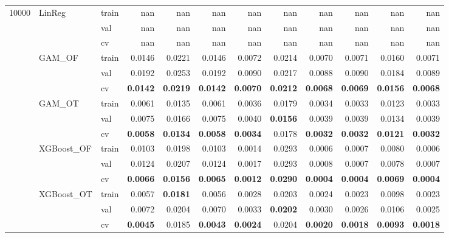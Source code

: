 \begin{tabular}{lllrrrrrrrrr}
\multirow[c]{15}{*}{10000} & \multirow[c]{3}{*}{LinReg} & train & nan & nan & nan & nan & nan & nan & nan & nan & nan \\
 &  & val & nan & nan & nan & nan & nan & nan & nan & nan & nan \\
 &  & cv & nan & nan & nan & nan & nan & nan & nan & nan & nan \\
 & \multirow[c]{3}{*}{GAM_OF} & train & 0.0146 & 0.0221 & 0.0146 & 0.0072 & 0.0214 & 0.0070 & 0.0071 & 0.0160 & 0.0071 \\
 &  & val & 0.0192 & 0.0253 & 0.0192 & 0.0090 & 0.0217 & 0.0088 & 0.0090 & 0.0184 & 0.0089 \\
 &  & cv & \bfseries 0.0142 & \bfseries 0.0219 & \bfseries 0.0142 & \bfseries 0.0070 & \bfseries 0.0212 & \bfseries 0.0068 & \bfseries 0.0069 & \bfseries 0.0156 & \bfseries 0.0068 \\
 & \multirow[c]{3}{*}{GAM_OT} & train & 0.0061 & 0.0135 & 0.0061 & 0.0036 & 0.0179 & 0.0034 & 0.0033 & 0.0123 & 0.0033 \\
 &  & val & 0.0075 & 0.0166 & 0.0075 & 0.0040 & \bfseries 0.0156 & 0.0039 & 0.0039 & 0.0134 & 0.0039 \\
 &  & cv & \bfseries 0.0058 & \bfseries 0.0134 & \bfseries 0.0058 & \bfseries 0.0034 & 0.0178 & \bfseries 0.0032 & \bfseries 0.0032 & \bfseries 0.0121 & \bfseries 0.0032 \\
 & \multirow[c]{3}{*}{XGBoost_OF} & train & 0.0103 & 0.0198 & 0.0103 & 0.0014 & 0.0293 & 0.0006 & 0.0007 & 0.0080 & 0.0006 \\
 &  & val & 0.0124 & 0.0207 & 0.0124 & 0.0017 & 0.0293 & 0.0008 & 0.0007 & 0.0078 & 0.0007 \\
 &  & cv & \bfseries 0.0066 & \bfseries 0.0156 & \bfseries 0.0065 & \bfseries 0.0012 & \bfseries 0.0290 & \bfseries 0.0004 & \bfseries 0.0004 & \bfseries 0.0069 & \bfseries 0.0004 \\
 & \multirow[c]{3}{*}{XGBoost_OT} & train & 0.0057 & \bfseries 0.0181 & 0.0056 & 0.0028 & 0.0203 & 0.0024 & 0.0023 & 0.0098 & 0.0023 \\
 &  & val & 0.0072 & 0.0204 & 0.0070 & 0.0033 & \bfseries 0.0202 & 0.0030 & 0.0026 & 0.0106 & 0.0025 \\
 &  & cv & \bfseries 0.0045 & 0.0185 & \bfseries 0.0043 & \bfseries 0.0024 & 0.0204 & \bfseries 0.0020 & \bfseries 0.0018 & \bfseries 0.0093 & \bfseries 0.0018 \\
\end{tabular}
